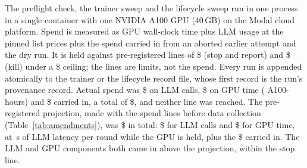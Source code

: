 The preflight check, the trainer sweep and the lifecycle sweep run in one process in a single
container with one NVIDIA A100 GPU (40\,GB) on the Modal cloud platform. Spend is measured as GPU wall-clock time plus LLM usage at the pinned list prices
plus the spend carried in from an aborted earlier attempt and the dry run. It is held against
pre-registered lines of \$\resSpendStopLine{} (stop and report) and \$\resKillLine{} (kill)
under a \$\resCeilingLine{} ceiling; the lines are limits, not the spend. Every run is
appended atomically to the trainer or the lifecycle record file, whose first record is the
run's provenance record. Actual spend was \$\resSpendLLM{} on LLM calls, \$\resSpendGPU{} on
GPU time (\resGPUHours{} A100-hours) and \$\resSpendPrior{} carried in, a total of
\$\resSpendTotal, and neither line was reached. The pre-registered projection, made with the
spend lines before data collection (Table~\ref{tab:amendments}), was \$\resProjTotal{} in total:
\$\resProjLLM{} for LLM calls and \$\resProjGPU{} for GPU time, at \resProjLatency{}\,s of LLM
latency per round while the GPU is held, plus the \$\resSpendPrior{} carried in. The LLM and GPU
components both came in above the projection, within the stop line.
